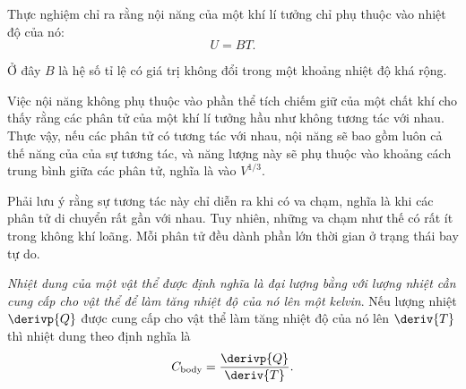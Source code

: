 
Thực nghiệm chỉ ra rằng nội năng của một khí lí tưởng chỉ phụ thuộc vào nhiệt độ của nó:
\begin{equation}\label{eq:10_23}
	U = B T.
\end{equation}

\noindent

Ở đây $B$ là hệ số tỉ lệ có giá trị không đổi trong một khoảng nhiệt độ khá rộng.


Việc nội năng không phụ thuộc vào phần thể tích chiếm giữ của một chất khí cho thấy rằng các phân tử của một khí lí tưởng hầu như không tương tác với nhau. Thực vậy, nếu các phân tử có tương tác với nhau, nội năng sẽ bao gồm luôn cả thế năng của của sự tương tác, và năng lượng này sẽ phụ thuộc vào khoảng cách trung bình giữa các phân tử, nghĩa là vào $V^{1/3}$.


Phải lưu ý rằng sự tương tác này chỉ diễn ra khi có va chạm, nghĩa là khi các phân tử di chuyển rất gần với nhau. Tuy nhiên, những va chạm như thế có rất ít trong không khí loãng. Mỗi phân tử đều dành phần lớn thời gian ở trạng thái bay tự do.


\textit{Nhiệt dung của một vật thể được định nghĩa là đại lượng bằng với lượng nhiệt cần cung cấp cho vật thể để làm tăng nhiệt độ của nó lên một kelvin}. Nếu lượng nhiệt $\derivp{Q}$ được cung cấp cho vật thể làm tăng nhiệt độ của nó lên $\deriv{T}$ thì nhiệt dung theo định nghĩa là
\begin{equation}\label{eq:10_24}
	C_{\text{body}} = \frac{\derivp{Q}}{\deriv{T}}.
\end{equation}

